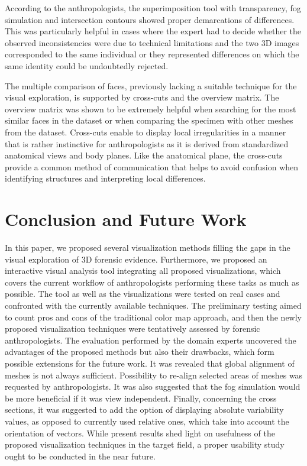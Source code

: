 \documentclass[final,5p,times]{elsarticle}
\begin{document}
According to the anthropologists, the superimposition tool with transparency, fog simulation and intersection contours showed proper demarcations of differences. This was particularly helpful in cases where the expert had to decide whether the observed inconsistencies were due to technical limitations and the two 3D images corresponded to the same individual or they represented differences on which the same identity could be undoubtedly rejected.
 
The multiple comparison of faces, previously lacking a suitable technique for the visual exploration, is supported by cross-cuts and the overview matrix. 
The overview matrix was shown to be extremely helpful when searching for the most similar faces in the dataset or when comparing the specimen with other meshes from the dataset. 
Cross-cuts enable to display local irregularities in a manner that is rather instinctive for anthropologists as it is derived from standardized anatomical views and body planes. 
Like the anatomical plane, the cross-cuts provide a common method of communication that helps to avoid confusion when identifying structures and interpreting local differences.

\section{Conclusion and Future Work} \label{conclusion}
In this paper, we proposed several visualization methods filling the gaps in the visual exploration of 3D forensic evidence.
Furthermore, we proposed an interactive visual analysis tool integrating all proposed visualizations, which covers the current workflow of anthropologists performing these tasks as much as possible.
The tool as well as the visualizations were tested on real cases and confronted with the currently available techniques. 
The preliminary testing aimed to count pros and cons of the traditional color map approach, and then the newly proposed visualization techniques were tentatively assessed by forensic anthropologists. 
The evaluation performed by the domain experts uncovered the advantages of the proposed methods but also their drawbacks, which form possible extensions for the future work. 
It was revealed that global alignment of meshes is not always sufficient.
Possibility to re-align selected areas of meshes was requested by anthropologists.
It was also suggested that the fog simulation would be more beneficial if it was view independent. 
Finally, concerning the cross sections, it was suggested to add the option of displaying absolute variability values, as opposed to currently used relative ones, which take into account the orientation of vectors.
While present results shed light on usefulness of the proposed visualization techniques in the target field, a proper usability study ought to be conducted in the near future. 
\end{document}
